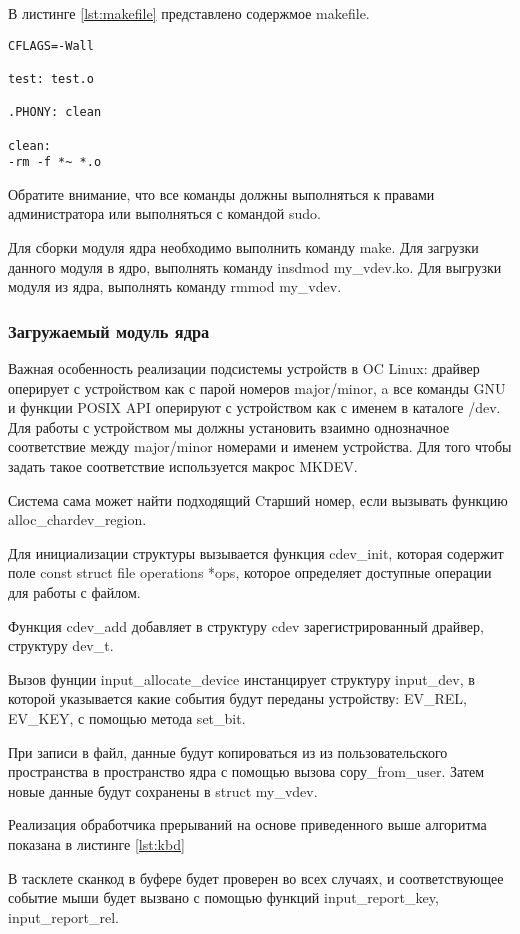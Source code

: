 В листинге \ref{lst:makefile} представлено содержмое makefile.

\begin{lstlisting}[caption=Makefile, label=lst:makefile]
CFLAGS=-Wall

test: test.o

.PHONY: clean

clean:
-rm -f *~ *.o
\end{lstlisting}

Обратите внимание, что все команды должны выполняться к правами администратора или выполняться с командой sudo.

Для сборки модуля ядра необходимо выполнить команду make.
Для загрузки данного модуля в ядро, выполнять команду insdmod my\_vdev.ko.
Для выгрузки модуля из ядра, выполнять команду rmmod my\_vdev.

\subsubsection{Загружаемый модуль ядра}
Важная особенность реализации подсистемы устройств в OC Linux: драйвер оперирует с устройством как с парой номеров major/minor, a все команды GNU и функции POSIX API оперируют с устройством как с именем в каталоге /dev. 
Для работы с устройством мы должны установить взаимно однозначное соответствие между major/minor номерами и именем устройства. 
Для того чтобы задать такое соответствие используется макрос MKDEV.

Система сама может найти подходящий Cтарший номер, если вызывать функцию alloc\_chardev\_region.

Для инициализации структуры вызывается функция cdev\_init, которая содержит поле const struct file operations *ops, которое определяет доступные операции для работы с файлом.

Функция cdev\_add добавляет в структуру cdev зарегистрированный драйвер, структуру dev\_t.

Вызов фунции input\_allocate\_device инстанцирует структуру input\_dev, в
которой указывается какие события будут переданы устройству: EV\_REL, EV\_KEY, с помощью метода set\_bit.

При записи в файл, данные будут копироваться из из пользовательского пространства в пространство ядра с помощью вызова сору\_from\_user. 
Затем новые данные будут сохранены в struct my\_vdev.

Реализация обработчика прерываний на основе приведенного выше
алгоритма показана в листинге \ref{lst:kbd}



В тасклете сканкод в буфере будет проверен во всех случаях, и соответствующее событие мыши будет вызвано с помощью функций input\_report\_key, input\_report\_rel. 
